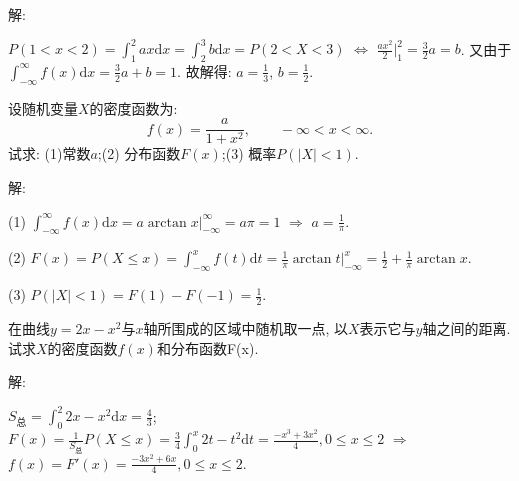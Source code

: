 \documentclass[standard]{ExBook}
\begin{document}
\begin{qitems}
\vspace{-5em}

    \begin{bbox}
解:

$\displaystyle P(1 < x < 2)=\int_{1}^{2}ax \mathrm{d}x=\int_{2}^{3}b\mathrm{d}x=P(2 < X < 3)$ $\Longleftrightarrow$ $\displaystyle\frac{a x^2}{2}\bigg|_{1}^{2}=\frac{3}{2}a=b$. 又由于$\displaystyle\int_{-\infty}^{\infty}f(x)\mathrm{d}x=\frac{3}{2}a+b=1$. 故解得: $a=\displaystyle\frac{1}{3}$, $b=\displaystyle\frac{1}{2}$.
    \end{bbox}

\vspace{-5em}

    \begin{bbox}
    \begin{shaded}
        \qitem
设随机变量$X$的密度函数为:
$$f(x)=\frac{a}{1+x^2},\qquad -\infty < x < \infty.$$
试求: (1)常数$a$;\qquad(2) 分布函数$F(x)$;\qquad(3) 概率$P(|X| < 1)$.
    \end{shaded}
    \end{bbox}

\vspace{-5em}

    \begin{bbox}
解: 

(1) $\displaystyle\int_{-\infty}^{\infty}f(x)\mathrm{d}x=a\arctan x\big|_{-\infty}^{\infty}=a\pi=1$ $\Longrightarrow$ $a=\displaystyle\frac{1}{\pi}$.

(2) $F(x)=P(X \leq x)=\displaystyle\int_{-\infty}^{x}f(t)\mathrm{d}t=\frac{1}{\pi}\arctan t\big|_{-\infty}^{x}=\frac{1}{2}+\frac{1}{\pi}\arctan x$.

(3) $P(|X| < 1)=F(1)-F(-1)=\displaystyle\frac{1}{2}$.
    \end{bbox}

\vspace{-5em}

    \begin{bbox}
    \begin{shaded}
        \qitem
在曲线$y=2x-x^2$与$x$轴所围成的区域中随机取一点, 以$X$表示它与$y$轴之间的距离. 试求$X$的密度函数$f(x)$和分布函数F(x).
    \end{shaded}
    \end{bbox}

\vspace{-5em}

    \begin{bbox}
解: 

$S_{\text{总}}=\displaystyle\int_{0}^{2}2x-x^2\mathrm{d}x=\frac{4}{3}$; $F(x)=\displaystyle\frac{1}{S_{\text{总}}}P(X\leq x)=\frac{3}{4}\int_{0}^{x}2t-t^2\mathrm{d}t=\frac{-x^3+3x^2}{4},0\leq x\leq 2$ $\Longrightarrow$ $f(x)=F'(x)=\displaystyle\frac{-3x^2+6x}{4},0\leq x\leq 2$.
    \end{bbox}


\end{qitems}
\end{document}

